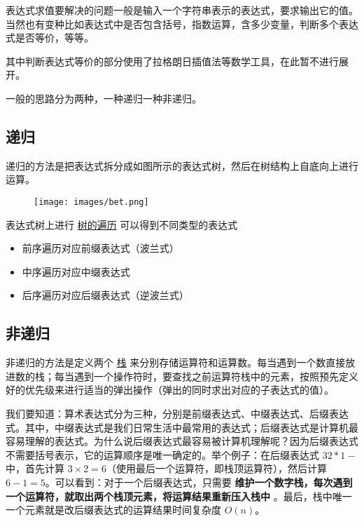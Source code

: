 
表达式求值要解决的问题一般是输入一个字符串表示的表达式，要求输出它的值。当然也有变种比如表达式中是否包含括号，指数运算，含多少变量，判断多个表达式是否等价，等等。

其中判断表达式等价的部分使用了拉格朗日插值法等数学工具，在此暂不进行展开。

一般的思路分为两种，一种递归一种非递归。

\subsection{递归}

递归的方法是把表达式拆分成如图所示的表达式树，然后在树结构上自底向上进行运算。

\begin{figure}[h]
\centering
\texttt{[image: images/bet.png]} 

\end{figure}

表达式树上进行 \href{/graph/traverse/#dfs_3}{树的遍历} 可以得到不同类型的表达式

\begin{itemize}
\item 前序遍历对应前缀表达式（波兰式）
\item 中序遍历对应中缀表达式
\item 后序遍历对应后缀表达式（逆波兰式）
\end{itemize}

\subsection{非递归}

非递归的方法是定义两个 \href{/stack/}{栈} 来分别存储运算符和运算数。每当遇到一个数直接放进数的栈；每当遇到一个操作符时，要查找之前运算符栈中的元素，按照预先定义好的优先级来进行适当的弹出操作（弹出的同时求出对应的子表达式的值）。

我们要知道：算术表达式分为三种，分别是前缀表达式、中缀表达式、后缀表达式。其中，中缀表达式是我们日常生活中最常用的表达式；后缀表达式是计算机最容易理解的表达式。为什么说后缀表达式最容易被计算机理解呢？因为后缀表达式不需要括号表示，它的运算顺序是唯一确定的。举个例子：在后缀表达式 $3 2 * 1 -$ 中，首先计算 $3 \times 2 = 6$（使用最后一个运算符，即栈顶运算符），然后计算 $6 - 1 = 5$。可以看到：对于一个后缀表达式，只需要 \textbf{ 维护一个数字栈，每次遇到一个运算符，就取出两个栈顶元素，将运算结果重新压入栈中 }。最后，栈中唯一一个元素就是改后缀表达式的运算结果时间复杂度 $O(n)$。

